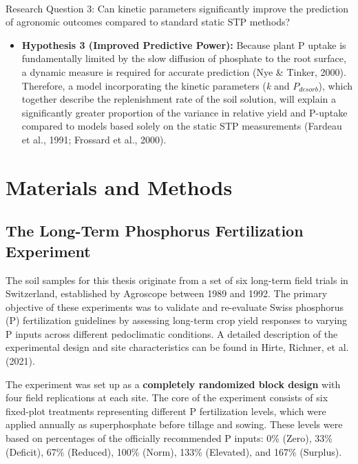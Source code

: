\documentclass[
  a4paper,
]{article}
\makeatletter
\let\oldparagraph\paragraph
\renewcommand{\paragraph}{
    \@ifstar
      \xxxParagraphStar
      \xxxParagraphNoStar
  }
\newcommand{\xxxParagraphStar}[1]{\oldparagraph*{#1}\mbox{}}
\newcommand{\xxxParagraphNoStar}[1]{\oldparagraph{#1}\mbox{}}
\providecommand{\tightlist}{%
  \setlength{\itemsep}{0pt}\setlength{\parskip}{0pt}}
\makeatother
\begin{document}
\paragraph{Research Question 3: Can kinetic parameters significantly
improve the prediction of agronomic outcomes compared to standard static
STP
methods?}\label{research-question-3-can-kinetic-parameters-significantly-improve-the-prediction-of-agronomic-outcomes-compared-to-standard-static-stp-methods}

\begin{itemize}
\tightlist
\item
  \textbf{Hypothesis 3 (Improved Predictive Power):} Because plant P
  uptake is fundamentally limited by the slow diffusion of phosphate to
  the root surface, a dynamic measure is required for accurate
  prediction (Nye \& Tinker, 2000). Therefore, a model incorporating the
  kinetic parameters (\emph{k} and \(P_{desorb}\)), which together
  describe the replenishment rate of the soil solution, will explain a
  significantly greater proportion of the variance in relative yield and
  P-uptake compared to models based solely on the static STP
  measurements (Fardeau et al., 1991; Frossard et al., 2000).
\end{itemize}

\section{Materials and Methods}\label{sec-materials-and-methods}

\subsection{The Long-Term Phosphorus Fertilization
Experiment}\label{sec-the-long-term-phosphorus-fertilization-experiment}

The soil samples for this thesis originate from a set of six long-term
field trials in Switzerland, established by Agroscope between 1989 and
1992. The primary objective of these experiments was to validate and
re-evaluate Swiss phosphorus (P) fertilization guidelines by assessing
long-term crop yield responses to varying P inputs across different
pedoclimatic conditions. A detailed description of the experimental
design and site characteristics can be found in Hirte, Richner, et al.
(2021).

The experiment was set up as a \textbf{completely randomized block
design} with four field replications at each site. The core of the
experiment consists of six fixed-plot treatments representing different
P fertilization levels, which were applied annually as superphosphate
before tillage and sowing. These levels were based on percentages of the
officially recommended P inputs: 0\% (Zero), 33\% (Deficit), 67\%
(Reduced), 100\% (Norm), 133\% (Elevated), and 167\% (Surplus).
\end{document}
